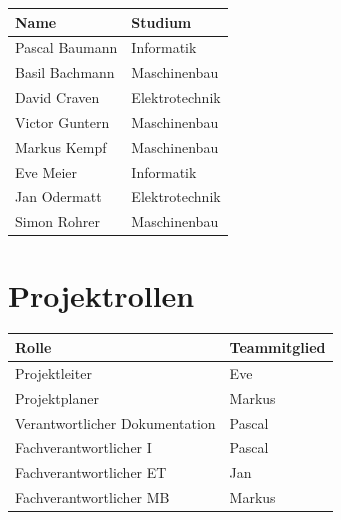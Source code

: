 \documentclass[a4paper]{report}
\begin{document}
\begin{tabular}{|l|l|}
	\hline 
	\textbf{Name} & \textbf{Studium} \\ 
	\hline 
	Pascal Baumann & Informatik \\ 
	\hline 
	Basil Bachmann & Maschinenbau \\ 
	\hline 
	David Craven & Elektrotechnik \\ 
	\hline 
	Victor Guntern & Maschinenbau \\ 
	\hline
	Markus Kempf & Maschinenbau \\ 
	\hline  
	Eve Meier & Informatik \\ 
	\hline 
	Jan Odermatt & Elektrotechnik \\
	\hline
	Simon Rohrer & Maschinenbau \\
	\hline
\end{tabular} 

\section{Projektrollen}

\begin{tabular}{|l|l|}
	\hline 
	\textbf{Rolle} & \textbf{Teammitglied} \\ 
	\hline 
	Projektleiter & Eve \\ 
	\hline 
	Projektplaner & Markus \\ 
	\hline 
	Verantwortlicher Dokumentation & Pascal \\ 
	\hline 
	Fachverantwortlicher I & Pascal \\ 
	\hline 
	Fachverantwortlicher ET & Jan \\ 
	\hline 
	Fachverantwortlicher MB & Markus \\ 
	\hline 
\end{tabular} 

\newpage

\printbibliography
\end{document}
